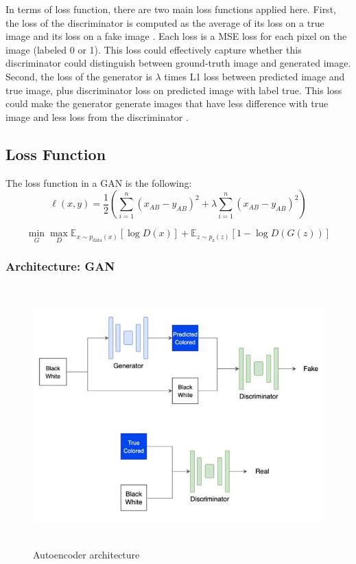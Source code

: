 \documentclass{article}
\begin{document}
In terms of loss function, there are two main loss functions applied here. 
First, the loss of the discriminator is computed as the average of its loss on a true image and its loss on a fake image \cite{5}. 
Each loss is a MSE loss for each pixel on the image (labeled 0 or 1). 
This loss could effectively capture whether this discriminator could distinguish between ground-truth image and generated image.
Second, the loss of the generator is $\lambda$ times L1 loss between predicted image and true image, plus discriminator loss on predicted image with label true.
This loss could make the generator generate images that have less difference with true image and less loss from the discriminator \cite{6}.

\subsection{Loss Function}
The loss function in a GAN is the following:
{\Large
\begin{equation}
    \ell(x,y) = \frac{1}{2} \left( \sum_{i=1}^{n} \left( x_{AB} - y_{AB} \right)^2 + \lambda \sum_{i=1}^{n} \left( x_{AB} - y_{AB} \right)^2 \right)
\end{equation}
}

{\Large
\begin{equation}
\min_{G}\max_{D}\mathbb{E}_{x\sim p_{\text{data}}(x)}[\log{D(x)}] +  \mathbb{E}_{z\sim p_{\text{z}}(z)}[1 - \log{D(G(z))}]
\end{equation}
}

\subsubsection{Architecture: GAN}

\begin{figure}[htbp!]
    \centering
        \includegraphics[width=15cm, height=10cm]{gan.jpg}
        \caption{Autoencoder architecture}
\end{figure}
\end{document}
